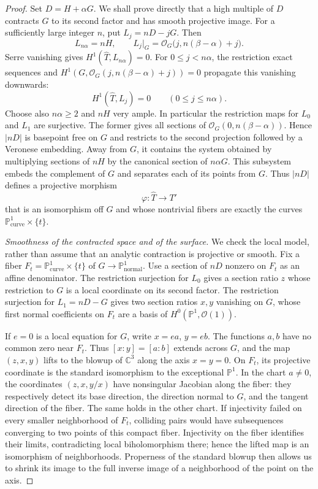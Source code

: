 \documentclass[11pt,reqno]{amsart}
\numberwithin{equation}{section}
\theoremstyle{definition}
\theoremstyle{remark}
\newcommand{\C}{\mathbb C}
\newcommand{\PP}{\mathbb P}
\begin{document}
\begin{proof}
Set $D=H+\alpha G$.  We shall prove directly that a high multiple of
$D$ contracts $G$ to its second factor and has smooth projective image.
For a sufficiently large integer $n$, put
$L_j=nD-jG$.  Then
\[
 L_{n\alpha}=nH,
 \qquad L_j|_G=\mathcal O_G\bigl(j,n(\beta-\alpha)+j\bigr).
\]
Serre vanishing gives $H^1(\widehat T,L_{n\alpha})=0$.
For $0\le j<n\alpha$, the restriction exact sequences and
$H^1(G,\mathcal O_G(j,n(\beta-\alpha)+j))=0$ propagate this
vanishing downwards:
\begin{equation}\label{proj:vanishing}
 H^1(\widehat T,L_j)=0\qquad(0\le j\le n\alpha).
\end{equation}
Choose also $n\alpha\ge2$ and $nH$ very ample.  In particular the
restriction maps for $L_0$ and $L_1$ are surjective.  The former gives
all sections of $\mathcal O_G(0,n(\beta-\alpha))$.  Hence $|nD|$ is
basepoint free on $G$ and restricts to the second projection followed
by a Veronese embedding.  Away from $G$, it contains the system
obtained by multiplying sections of $nH$ by the canonical section of
$n\alpha G$.  This subsystem embeds the complement of $G$ and
separates each of its points from $G$.  Thus $|nD|$ defines a projective
morphism
\[
 \varphi:\widehat T\longrightarrow T'
\]
that is an isomorphism off $G$ and whose nontrivial fibers are exactly
the curves $\PP^1_{\mathrm{curve}}\times\{t\}$.

\smallskip
\noindent\emph{Smoothness of the contracted space and of the surface.}
We check the local model, rather than assume that an analytic
contraction is projective or smooth.  Fix a fiber
$F_t=\PP^1_{\mathrm{curve}}\times\{t\}$ of $G\to\PP^1_{\mathrm{normal}}$.
Use a section of $nD$ nonzero on $F_t$ as an affine denominator.
The restriction surjection for $L_0$ gives a section ratio $z$ whose
restriction to $G$ is a local coordinate on its second factor.
The restriction surjection for $L_1=nD-G$ gives two section ratios
$x,y$ vanishing on $G$, whose first normal coefficients on $F_t$ are
a basis of $H^0(\PP^1,\mathcal O(1))$.

If $e=0$ is a local equation for $G$, write $x=ea$, $y=eb$.
The functions $a,b$ have no common zero near $F_t$.  Thus
$[x:y]=[a:b]$ extends across $G$, and the map $(z,x,y)$ lifts to the
blowup of $\C^3$ along the axis $x=y=0$.  On $F_t$, its projective
coordinate is the standard isomorphism to the exceptional $\PP^1$.
In the chart $a\ne0$, the coordinates $(z,x,y/x)$ have nonsingular
Jacobian along the fiber: they respectively detect its base direction,
the direction normal to $G$, and the tangent direction of the fiber.
The same holds in the other chart.  If injectivity failed on every
smaller neighborhood of $F_t$, colliding pairs would have subsequences
converging to two points of this compact fiber.  Injectivity on the fiber
identifies their limits, contradicting local biholomorphism there; hence
the lifted map is an isomorphism of neighborhoods.  Properness of the
standard blowup then allows us to shrink its image to the full inverse
image of a neighborhood of the point on the axis.


\end{proof}
\end{document}
